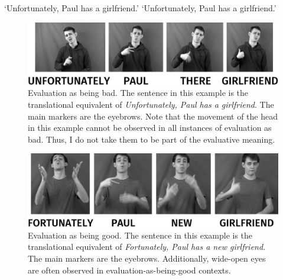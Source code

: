 \begin{exe}
\ex\label{ex:unfortgirlfried}\begin{xlist}
\ex {}
%
\glt `Unfortunately, Paul has a girlfriend.' \label{ex:unfortgirlfrieda}
\ex {}
\glt `Unfortunately, Paul has a girlfriend.' \label{ex:unfortgirlfriedb}


\end{xlist}
\end{exe}

\begin{figure}[b]
\centering
	\includegraphics[width=1.0\textwidth]{evalbadsw.jpg}
	\caption{Evaluation as being bad. The sentence in this example is the translational equivalent of \textit{Unfortunately, Paul has a girlfriend}. The main markers are the eyebrows. Note that the movement of the head in this example cannot be observed in all instances of evaluation as bad. Thus, I do not take them to be part of the evaluative meaning.}
	\label{fig:evalbad}
\end{figure}

\begin{figure}[bt]
\centering
	\includegraphics[width=1.0\textwidth]{evalgoodnewsw.jpg}
	\caption{Evaluation as being good. The sentence in this example is the translational equivalent of \textit{Fortunately, Paul has a new girlfriend}. The main markers are the eyebrows. Additionally, wide-open eyes are often observed in evaluation-as-being-good contexts.}
	\label{fig:evalgooda}
\end{figure}


